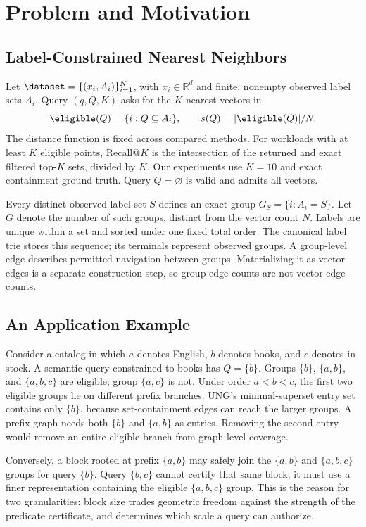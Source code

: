 \section{Problem and Motivation}
\label{sec:problem}
\subsection{Label-Constrained Nearest Neighbors}
Let $\dataset=\{(x_i,A_i)\}_{i=1}^{N}$, with $x_i\in\mathbb{R}^d$ and
finite, nonempty observed label sets $A_i$.  Query $(q,Q,K)$ asks for the $K$ nearest vectors in
\begin{equation}
  \eligible(Q)=\{i:Q\subseteq A_i\},\qquad s(Q)=|\eligible(Q)|/N.
\end{equation}
The distance function is fixed across compared methods.  For workloads with
at least $K$ eligible points, Recall@$K$ is the intersection of the returned
and exact filtered top-$K$ sets, divided by $K$.  Our experiments use $K=10$ and exact
containment ground truth.  Query $Q=\varnothing$ is valid and admits all vectors.

Every distinct observed label set $S$ defines an exact group
$G_S=\{i:A_i=S\}$.  Let $G$ denote the number of such groups, distinct from
the vector count $N$.  Labels are unique within a set and sorted under one
fixed total order.  The canonical label trie stores this sequence; its
terminals represent observed groups.  A group-level edge describes permitted
navigation between groups.  Materializing it as vector edges is a separate
construction step, so group-edge counts are not vector-edge counts.

\subsection{An Application Example}
Consider a catalog in which $a$ denotes English, $b$ denotes books, and $c$
denotes in-stock.  A semantic query constrained to books has $Q=\{b\}$.
Groups $\{b\}$, $\{a,b\}$, and $\{a,b,c\}$ are eligible; group $\{a,c\}$ is
not.  Under order $a<b<c$, the first two eligible groups lie on different
prefix branches.  UNG's minimal-superset entry set contains only $\{b\}$,
because set-containment edges can reach the larger groups.  A prefix graph
needs both $\{b\}$ and $\{a,b\}$ as entries.  Removing the second entry would
remove an entire eligible branch from graph-level coverage.

Conversely, a block rooted at prefix $\{a,b\}$ may safely join the
$\{a,b\}$ and $\{a,b,c\}$ groups for query $\{b\}$.  Query $\{b,c\}$ cannot
certify that same block; it must use a finer representation containing the
eligible $\{a,b,c\}$ group.  This is the reason for two granularities: block
size trades geometric freedom against the strength of the predicate
certificate, and determines which scale a query can authorize.

